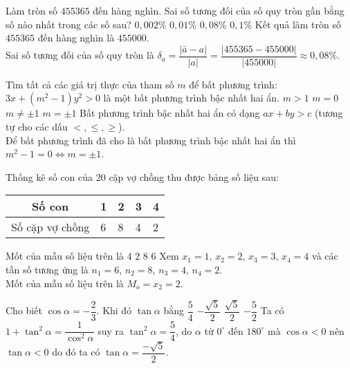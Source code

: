 \begin{ex}%
	Làm tròn số $455365$ đến hàng nghìn. Sai số tương đối của số quy tròn gần bằng số nào nhất trong các số sau?
	\choice 
	{$0,002\%$}
	{$0,01\%$}
	{\True $0,08\%$}
	{$0,1\%$}
	\loigiai 
	{ Kết quả làm tròn số $455365$ đến hàng nghìn là $455000$.\\
		Sai số tương đối của số quy tròn là $\delta_{a}=\dfrac{|\bar{a}-a|}{|a|}
		=\dfrac{|455365-455000|}{|455000|}\approx 0,08\%. $
	}
\end{ex}
\begin{ex}%
	Tìm tất cả các giá trị thực của tham số $m$ để bất phương trình: $3x+\left(m^2-1\right) y^2>0$ là một bất phương trình bậc nhất hai ẩn.
	\choice 
	{$m>1$}
	{$m=0$}
	{$m\ne\pm 1$}
	{\True $m=\pm 1$}
	\loigiai 
	{ Bất phương trình bậc nhất hai ẩn có dạng $ax+by>c$ (tương tự cho các dấu $<, \leq, \geq$).\\
		Để bất phương trình đã cho là bất phương trình bậc nhất hai ẩn thì $m^2-1=0 \Leftrightarrow m = \pm 1$.
	}
\end{ex}

\begin{ex}%
	Thống kê số con của 20 cặp vợ chồng thu được bảng số liệu sau:\\
	\begin{center}
		\begin{tabular}{|c|l|l|l|l|}
			\hline Số con&1&2&3&4\\
			\hline Số cặp vợ chồng&6&8&4&2\\
			\hline 
		\end{tabular}
	\end{center}
	Mốt của mẫu số liệu trên là 
	\choice 
	{$4$}
	{\True $2$}
	{$8$}
	{$6$}
	\loigiai 
	{Xem $x_1=1$, $x_2 = 2$, $x_3=3$, $x_4=4$ và các tần số tương ứng là $n_1=6$, $n_2=8$, $n_3=4$, $n_4=2$.\\
		Mốt của mẫu số liệu trên là $M_o=x_2=2$.
	}
\end{ex}

\begin{ex}%
	Cho biết $\cos\alpha=-\dfrac{2}{3}$. Khi đó $\tan\alpha$ bằng 
	\choice 
	{$\dfrac{5}{4}$}
	{\True $-\dfrac{\sqrt{5}}{2}$}
	{$\dfrac{\sqrt{5}}{2}$}
	{$-\dfrac{5}{2}$}
	\loigiai 
	{Ta có $1+\tan^2{\alpha}=\dfrac{1}{\cos^2{\alpha}}$ suy ra $\tan^2{\alpha}=\dfrac{5}{4}$, do $\alpha$ từ $0^\circ$ đến $180^\circ$ mà $\cos{\alpha}<0$ nên $\tan{\alpha}<0$ do đó ta có $\tan{\alpha}=\dfrac{-\sqrt{5}}{2}$.
	}
\end{ex}

